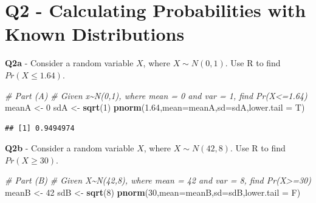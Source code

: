 \documentclass[
]{article}
\newenvironment{Shaded}{\begin{snugshade}}{\end{snugshade}}
\newcommand{\AttributeTok}[1]{\textcolor[rgb]{0.13,0.29,0.53}{#1}}
\newcommand{\CommentTok}[1]{\textcolor[rgb]{0.56,0.35,0.01}{\textit{#1}}}
\newcommand{\DecValTok}[1]{\textcolor[rgb]{0.00,0.00,0.81}{#1}}
\newcommand{\FloatTok}[1]{\textcolor[rgb]{0.00,0.00,0.81}{#1}}
\newcommand{\FunctionTok}[1]{\textcolor[rgb]{0.13,0.29,0.53}{\textbf{#1}}}
\newcommand{\NormalTok}[1]{#1}
\newcommand{\OtherTok}[1]{\textcolor[rgb]{0.56,0.35,0.01}{#1}}
\begin{document}
\hfill\break
\hfill\break

\hypertarget{q2---calculating-probabilities-with-known-distributions}{%
\section{Q2 - Calculating Probabilities with Known
Distributions}\label{q2---calculating-probabilities-with-known-distributions}}

\hfill\break

\textbf{Q2a} - Consider a random variable \(X\), where
\(X \sim N(0,1)\). Use R to find \(Pr(X \leq 1.64)\).

\hfill\break

\begin{Shaded}
\begin{Highlighting}[]
\CommentTok{\# Part (A)}
\CommentTok{\# Given x\textasciitilde{}N(0,1), where mean = 0 and var = 1, find Pr(X\textless{}=1.64)}
\NormalTok{meanA }\OtherTok{\textless{}{-}} \DecValTok{0}
\NormalTok{sdA }\OtherTok{\textless{}{-}} \FunctionTok{sqrt}\NormalTok{(}\DecValTok{1}\NormalTok{)}
\FunctionTok{pnorm}\NormalTok{(}\FloatTok{1.64}\NormalTok{,}\AttributeTok{mean=}\NormalTok{meanA,}\AttributeTok{sd=}\NormalTok{sdA,}\AttributeTok{lower.tail =}\NormalTok{ T)}
\end{Highlighting}
\end{Shaded}

\begin{verbatim}
## [1] 0.9494974
\end{verbatim}

\hfill\break

\textbf{Q2b} - Consider a random variable \(X\), where
\(X \sim N(42,8)\). Use R to find \(Pr(X \geq 30)\).

\hfill\break

\begin{Shaded}
\begin{Highlighting}[]
\CommentTok{\# Part (B)}
\CommentTok{\# Given X\textasciitilde{}N(42,8), where mean = 42 and var = 8, find Pr(X\textgreater{}=30)}
\NormalTok{meanB }\OtherTok{\textless{}{-}} \DecValTok{42}
\NormalTok{sdB }\OtherTok{\textless{}{-}} \FunctionTok{sqrt}\NormalTok{(}\DecValTok{8}\NormalTok{)}
\FunctionTok{pnorm}\NormalTok{(}\DecValTok{30}\NormalTok{,}\AttributeTok{mean=}\NormalTok{meanB,}\AttributeTok{sd=}\NormalTok{sdB,}\AttributeTok{lower.tail =}\NormalTok{ F)}
\end{Highlighting}
\end{Shaded}
\end{document}

